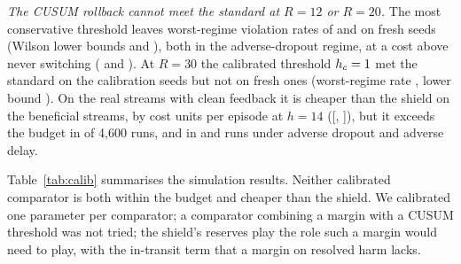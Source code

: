 \documentclass[10pt]{article}
\theoremstyle{plain}
\theoremstyle{definition}
\begin{document}
\emph{The CUSUM rollback cannot meet the standard at $R=12$ or $R=20$.} The most conservative threshold leaves worst-regime violation rates of \CalCusWorstA{} and \CalCusWorstB{} on fresh seeds (Wilson lower bounds \CalCusWorstLoA{} and \CalCusWorstLoB), both in the adverse-dropout regime, at a cost above never switching (\CalCusDNeverA{} and \CalCusDNeverB). At $R=30$ the calibrated threshold $h_c=1{}$ met the standard on the calibration seeds but not on fresh ones (worst-regime rate \CalCusWorstC, lower bound \CalCusWorstLoC). On the real streams with clean feedback it is cheaper than the shield on the beneficial streams, by \RCalCusVsShield{} cost units per episode at $h=14$ ([\RCalCusVsShieldLo, \RCalCusVsShieldHi]), but it exceeds the budget in \RCalCusViolCleanFourteen{} of 4{,}600 runs, and in \RCalCusViolDropFourteen{} and \RCalCusViolDelayFourteen{} runs under adverse dropout and adverse delay.

Table~\ref{tab:calib} summarises the simulation results. Neither calibrated comparator is both within the budget and cheaper than the shield. We calibrated one parameter per comparator; a comparator combining a margin with a CUSUM threshold was not tried; the shield's reserves play the role such a margin would need to play, with the in-transit term that a margin on resolved harm lacks.

\begin{table}[t]
\caption{Real streams, pooled over 14 streams (equal weight), \RealRunsPerArm{} runs per arm and condition. $J$ is mean cost per episode, ``vs never'' the difference in $J$, ``viol.'' the number of runs above the budget: $R=24$ for the comparators, the arm's own $R$ ($24$, $60$ or $110$) for the shield and stop-loss. Source: \texttt{real\_tables.md}.}\label{tab:real}
\centering\scriptsize
\resizebox{\linewidth}{!}{}
\end{table}

\begin{table}[t]
\caption{Calibrated comparators (fresh simulation seeds, \NRegimes{} regimes). Each comparator's safety parameter was set on separate calibration seeds to the shield's standard (violation rate at most $.05$ in every regime). ``vs never'' is the pooled difference in $J$. Source: \texttt{calib\_summary.json}.}\label{tab:calib}
\centering\scriptsize
\resizebox{\linewidth}{!}{}
\end{table}
\end{document}
